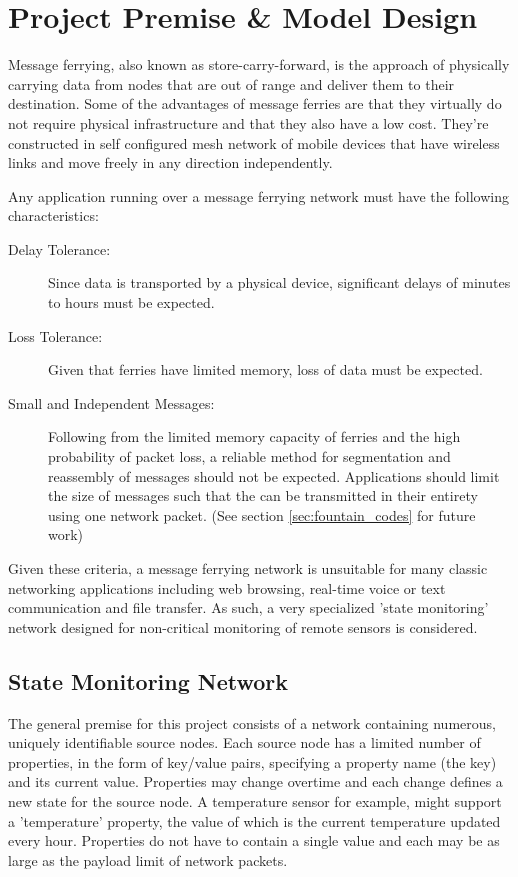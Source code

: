 \chapter{Project Premise \& Model Design} 



Message ferrying, also known as store-carry-forward, is the approach of physically carrying data from nodes that are out of range and deliver them to their destination. 
Some of the advantages of message ferries are that they virtually do not require physical infrastructure and that they also have a low cost. 
They're constructed in self configured mesh network of mobile devices that have wireless links and
move freely in any direction independently. 
	


Any application running over a message ferrying network must have the following characteristics:

\begin{description}
\item[Delay Tolerance: ]
Since data is transported by a physical device, significant delays of minutes to hours must be expected.
\item[Loss Tolerance: ]
Given that ferries have limited memory, loss of data must be expected.
\item[Small and Independent Messages: ]
Following from the limited memory capacity of ferries and the high probability of packet loss, a reliable method for segmentation and reassembly of messages should not be expected. 
Applications should limit the size of messages such that the can be transmitted in their entirety using one network packet.
(See section \ref{sec:fountain_codes} for future work)
\end{description}

Given these criteria, a message ferrying network is unsuitable for many classic networking applications including web browsing, real-time voice or text communication and file transfer.
As such, a very specialized 'state monitoring' network designed for non-critical monitoring of remote sensors is considered.

\section{State Monitoring Network}

The general premise for this project consists of a network containing numerous, uniquely identifiable source nodes. 
Each source node has a limited number of properties, in the form of key/value pairs, specifying a property name (the key) and its current value.
Properties may change overtime and each change defines a new state for the source node.
A temperature sensor for example, might support a 'temperature' property, the value of which is the current temperature updated every hour.
Properties do not have to contain a single value and each may be as large as the payload limit of network packets. %

